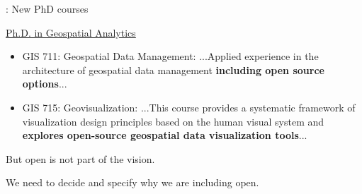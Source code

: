 \documentclass[xcolor={dvipsnames,usenames},beamer,aspectratio=169]{beamer}
\begin{document}
\begin{frame}{\coursesTitle: New PhD courses}


\begin{block}{\href{https://cnr.ncsu.edu/geospatial/academics/phd-in-geospatial-analytics/}%
  {Ph.D. in Geospatial Analytics}}
\begin{itemize}
 \item GIS 711: Geospatial Data Management:
...Applied experience in the architecture of geospatial data management \textbf{including open source options}...

\item GIS 715: Geovisualization:
...This course provides a systematic framework of visualization design principles based on the human visual system and \textbf{explores open-source geospatial data visualization tools}...
\end{itemize}

\end{block}

But open is not part of the vision.

\textrightarrow We need to decide and specify why we are including open.

\end{frame}

\newcommand{\geoforalllab}{NCSU GeoForAll Lab}
\end{document}
